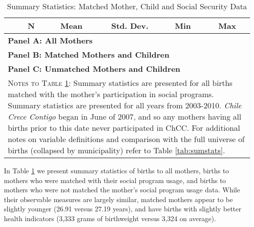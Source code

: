 \documentclass[12pt]{article}
\begin{document}
\begin{spacing}{1.4}
\begin{table}[htpb!]
  \begin{center}
    \caption{Summary Statistics: Matched Mother, Child and Social Security Data}
    \label{tab:sumstatsMother}
    \begin{tabular}{lccccc} \toprule
      & N& Mean & Std. Dev. & Min & Max \\ \midrule
      \multicolumn{6}{l}{\textbf{Panel A: All Mothers}} \\
      
      \multicolumn{6}{l}{\textbf{Panel B: Matched Mothers and Children}} \\
      
      \multicolumn{6}{l}{\textbf{Panel C: Unmatched Mothers and Children}} \\
      
      \bottomrule
      \multicolumn{6}{p{15.4cm}}{{\footnotesize \textsc{Notes to Table \ref{tab:sumstatsMother}}:
          Summary statistics are presented for all births matched with the mother's participation
          in social programs. Summary statistics are presented for all years from 2003-2010.
          \emph{Chile Crece Contigo} began in June of 2007, and so any mothers having all births
          prior to this date never participated in ChCC.  For additional notes on variable definitions
          and comparison with the full universe of births (collapsed by municipality) refer to Table
      \ref{tab:sumstats}.}}
      \end{tabular}
  \end{center}
\end{table}


In Table \ref{tab:sumstatsMother} we present summary statistics of
births to all mothers, births to mothers who were matched with their
social program usage, and births to mothers who were not matched
the mother's social program usage data.  While their observable measures
are largely similar, matched mothers appear to be slightly younger
(26.91 versus 27.19 years), and have births with slightly better health
indicators (3,333 grams of birthweight versus 3,324 on average).


\end{spacing}
\end{document}
